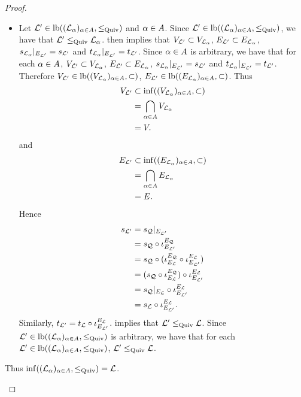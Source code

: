 \documentclass{book}
\begin{document}
\begin{proof}
\begin{enumerate}
\begin{itemize}
\begin{enumerate}
					\item $V_{\ML} \subset V_{\ML_{\al}}$ and $E_{\ML} \subset E_{\ML_{\al}}$,
					\item $s_{\ML_{\al}}|_{E_{\ML}} = s_{\ML}$ and $t_{\ML_{\al}}|_{E_{\ML}} = t_{\ML}$.
				\end{enumerate}
				 implies that $\ML \in \Subquiv(\ML_{\al})$. Hence $\ML \leqquiv \ML_{\al}$. Since $\al \in A$ is arbitrary, we have that for each $\al \in A$, $\ML \leqquiv \ML_{\al}$. Thus $\ML \in \lbd((\ML_{\al})_{\al \in A}, \leqquiv)$. 
				\item Let $\mathcal{L}' \in \operatorname{lb}((\mathcal{L}_{\alpha})_{\alpha \in A}, \leq_\text{Quiv})$ and $\al \in A$. Since $\mathcal{L}' \in \operatorname{lb}((\mathcal{L}_{\alpha})_{\alpha \in A}, \leq_\text{Quiv})$, we have that $\mathcal{L}' \leq_\text{Quiv} \mathcal{L}_{\alpha}$.  then implies that $V_{\mathcal{L}'} \subset V_{\mathcal{L}_{\alpha}}$, $E_{\mathcal{L}'} \subset E_{\mathcal{L}_{\alpha}}$, $s_{\mathcal{L}_{\alpha}}|_{E_{\mathcal{L}'}} = s_{\mathcal{L}'}$ and $t_{\mathcal{L}_{\alpha}}|_{E_{\mathcal{L}'}} = t_{\mathcal{L}'}$. Since $\al \in A$ is arbitrary, we have that for each $\al \in A$, $V_{\mathcal{L}'} \subset V_{\mathcal{L}_{\alpha}}$, $E_{\mathcal{L}'} \subset E_{\mathcal{L}_{\alpha}}$, $s_{\mathcal{L}_{\alpha}}|_{E_{\mathcal{L}'}} = s_{\mathcal{L}'}$ and $t_{\mathcal{L}_{\alpha}}|_{E_{\mathcal{L}'}} = t_{\mathcal{L}'}$. Therefore $V_{\mathcal{L}'} \in \operatorname{lb}((V_{\mathcal{L}_{\alpha}})_{\alpha \in A}, \subset)$, $E_{\mathcal{L}'} \in \operatorname{lb}((E_{\mathcal{L}_{\alpha}})_{\alpha \in A}, \subset)$. Thus 
				\begin{align*}
					V_{\mathcal{L}'}
					& \subset \inf((V_{\mathcal{L}_{\alpha}})_{\alpha \in A}, \subset) \\
					& = \bigcap\limits_{\alpha \in A} V_{\mathcal{L}_{\alpha}} \\
					& = V. 
				\end{align*}
				and 
				\begin{align*}
					E_{\mathcal{L}'}
					& \subset \inf((E_{\mathcal{L}_{\alpha}})_{\alpha \in A}, \subset) \\
					& = \bigcap\limits_{\alpha \in A} E_{\mathcal{L}_{\alpha}} \\
					& = E. 
				\end{align*}
				Hence 
				\begin{align*}
					s_{\mathcal{L}'}
					& = s_{\mathcal{Q}}|_{E_{\mathcal{L}'}} \\
					& = s_{\mathcal{Q}} \circ \iota_{E_{\mathcal{L}'}}^{E_{\mathcal{Q}}} \\
					& = s_{\mathcal{Q}} \circ (\iota_{E_{\mathcal{L}}}^{E_{\mathcal{Q}}} \circ \iota_{E_{\mathcal{L}'}}^{E_{\mathcal{L}}}) \\
					& = (s_{\mathcal{Q}} \circ \iota_{E_{\mathcal{L}}}^{E_{\mathcal{Q}}}) \circ \iota_{E_{\mathcal{L}'}}^{E_{\mathcal{L}}} \\
					& = s_{\mathcal{Q}}|_{E_{\mathcal{L}}} \circ \iota_{E_{\mathcal{L}'}}^{E_{\mathcal{L}}} \\
					& = s_{\mathcal{L}} \circ \iota_{E_{\mathcal{L}'}}^{E_{\mathcal{L}}}.
				\end{align*}
				Similarly, $t_{\mathcal{L}'} = t_{\mathcal{L}} \circ \iota_{E_{\mathcal{L}'}}^{E_{\mathcal{L}}}$.  implies that $\mathcal{L}' \leq_\text{Quiv} \mathcal{L}$. Since $\mathcal{L}' \in \operatorname{lb}((\mathcal{L}_{\alpha})_{\alpha \in A}, \leq_\text{Quiv})$ is arbitrary, we have that for each $\mathcal{L}' \in \operatorname{lb}((\mathcal{L}_{\alpha})_{\alpha \in A}, \leq_\text{Quiv})$, $\mathcal{L}' \leq_\text{Quiv} \mathcal{L}$.
			\end{itemize}
			Thus $\inf ((\mathcal{L}_{\alpha})_{\alpha \in A} , \leq_\text{Quiv}) = \mathcal{L}$.
		\end{enumerate}
	\end{proof}
	
\end{document}
